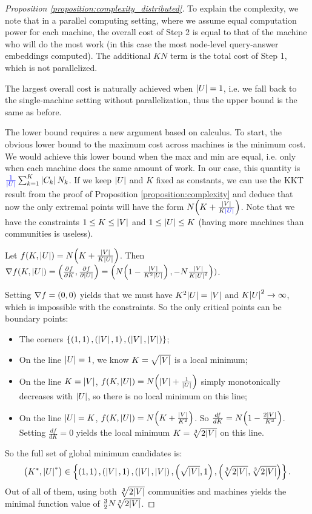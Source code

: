 \begin{proof}[Proposition \ref{proposition:complexity_distributed}]
    To explain the complexity, we note that in a parallel computing setting, where we assume equal computation power for each machine, the overall cost of Step 2 is equal to that of the machine who will do the most work (in this case the most node-level query-answer embeddings computed). The additional $KN$ term is the total cost of Step 1, which is not parallelized.

    The largest overall cost is naturally achieved when $\mathopen{}\left|U\right|=1$, i.e. we fall back to the single-machine setting without parallelization, thus the upper bound is the same as before.

    The lower bound requires a new argument based on calculus. To start, the obvious lower bound to the maximum cost across machines is the minimum cost. We would achieve this lower bound when the max and min are equal, i.e. only when each machine does the same amount of work. In our case, this quantity is $\textcolor{blue}{\frac{1}{\mathopen{}\left|U\right|}}\sum_{k=1}^{K}{\mathopen{}\left|C_k\right|N_k}$. If we keep $\mathopen{}\left|U\right|$ and $K$ fixed as constants, we can use the KKT result from the proof of Proposition \ref{proposition:complexity} and deduce that now the only extremal points will have the form $N\mathopen{}\left(K+\frac{\mathopen{}\left|V\right|}{K\textcolor{blue}{\mathopen{}\left|U\right|}}\right)$. Note that we have the constraints $1 \leq K \leq \mathopen{}\left|V\right|$ and $1 \leq \mathopen{}\left|U\right| \leq K$ (having more machines than communities is useless).

    Let $f\mathopen{}\left(K, \mathopen{}\left|U\right|\right)=N\mathopen{}\left(K+\frac{\mathopen{}\left|V\right|}{K\mathopen{}\left|U\right|}\right)$. Then $\nabla f \mathopen{}\left(K, \mathopen{}\left|U\right|\right)=\mathopen{}\left(\frac{\partial f}{\partial K},\frac{\partial f}{\partial \mathopen{}\left|U\right|}\right)=\mathopen{}\left(N\mathopen{}\left(1-\frac{\mathopen{}\left|V\right|}{K^2\mathopen{}\left|U\right|}\right), -N\frac{\mathopen{}\left|V\right|}{K\mathopen{}\left|U\right|^2}\right))$.

    Setting $\nabla f = \mathopen{}\left(0, 0\right)$ yields that we must have $K^2\mathopen{}\left|U\right|=\mathopen{}\left|V\right|$ and $K\mathopen{}\left|U\right|^2 \to \infty$, which is impossible with the constraints. So the only critical points can be boundary points:
    \begin{itemize}
        \item The corners $\mathopen{}\left\{\mathopen{}\left(1, 1\right), \mathopen{}\left(\mathopen{}\left|V\right|, 1\right), \mathopen{}\left(\mathopen{}\left|V\right|,\mathopen{}\left|V\right|\right)\right\}$;
        \item On the line $\mathopen{}\left|U\right|=1$, we know $K=\sqrt{\mathopen{}\left|V\right|}$ is a local minimum;
        \item On the line $K=\mathopen{}\left|V\right|$, $f\mathopen{}\left(K, \mathopen{}\left|U\right|\right)=N\mathopen{}\left(\mathopen{}\left|V\right|+\frac{1}{\mathopen{}\left|U\right|}\right)$ simply monotonically decreases with $\mathopen{}\left|U\right|$, so there is no local minimum on this line;
        \item On the line $\mathopen{}\left|U\right|=K$, $f\mathopen{}\left(K, \mathopen{}\left|U\right|\right)=N\mathopen{}\left(K+\frac{\mathopen{}\left|V\right|}{K^2}\right)$. So $\frac{d f}{d K}=N\mathopen{}\left(1-\frac{2\mathopen{}\left|V\right|}{K^3}\right)$. Setting $\frac{d f}{d K}=0$ yields the local minimum $K=\sqrt[3]{2\mathopen{}\left|V\right|}$ on this line.
    \end{itemize}
    So the full set of global minimum candidates is: $$\mathopen{}\left(K^*, \mathopen{}\left|U\right|^*\right) \in \mathopen{}\left\{\mathopen{}\left(1, 1\right), \mathopen{}\left(\mathopen{}\left|V\right|, 1\right), \mathopen{}\left(\mathopen{}\left|V\right|,\mathopen{}\left|V\right|\right), \mathopen{}\left(\sqrt{\mathopen{}\left|V\right|}, 1\right), \mathopen{}\left(\sqrt[3]{2\mathopen{}\left|V\right|}, \sqrt[3]{2\mathopen{}\left|V\right|}\right) \right\}.$$ Out of all of them, using both $\sqrt[3]{2\mathopen{}\left|V\right|}$ communities and machines yields the minimal function value of $\frac{3}{2}N\sqrt[3]{2\mathopen{}\left|V\right|}$.
\end{proof}

